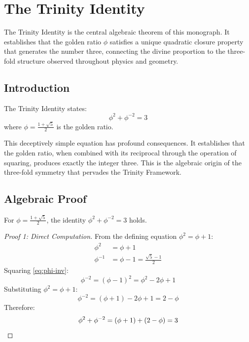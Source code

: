 \chapter{The Trinity Identity}
\label{ch:27-trinity}

The Trinity Identity is the central algebraic theorem of this monograph. It establishes that the golden ratio $\phi$ satisfies a unique quadratic closure property that generates the number three, connecting the divine proportion to the three-fold structure observed throughout physics and geometry.

\section{Introduction}

\begin{definition}
\label{def:trinity-identity}
The Trinity Identity states:
\begin{equation}
    \phi^2 + \phi^{-2} = 3
\end{equation}
where $\phi = \frac{1+\sqrt{5}}{2}$ is the golden ratio.
\end{definition}

This deceptively simple equation has profound consequences. It establishes that the golden ratio, when combined with its reciprocal through the operation of squaring, produces exactly the integer three. This is the algebraic origin of the three-fold symmetry that pervades the Trinity Framework.

\section{Algebraic Proof}

\begin{theorem}
\label{thm:trinity-identity}
For $\phi = \frac{1+\sqrt{5}}{2}$, the identity $\phi^2 + \phi^{-2} = 3$ holds.
\end{theorem}

\begin{proof}[Proof 1: Direct Computation]
From the defining equation $\phi^2 = \phi + 1$:
\begin{align}
    \phi^2 &= \phi + 1 \label{eq:phi-def} \\
    \phi^{-1} &= \phi - 1 = \frac{\sqrt{5}-1}{2} \label{eq:phi-inv}
\end{align}
Squaring \eqref{eq:phi-inv}:
\begin{equation}
    \phi^{-2} = (\phi - 1)^2 = \phi^2 - 2\phi + 1
\end{equation}
Substituting $\phi^2 = \phi + 1$:
\begin{equation}
    \phi^{-2} = (\phi + 1) - 2\phi + 1 = 2 - \phi
\end{equation}
Therefore:
\begin{equation}
    \phi^2 + \phi^{-2} = (\phi + 1) + (2 - \phi) = 3 \qedhere
\end{equation}
\end{proof}

